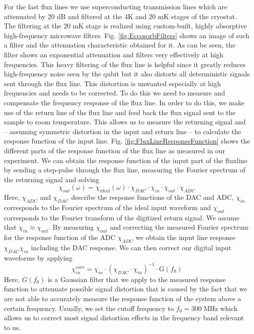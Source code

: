 For the fast flux lines we use superconducting transmission lines which are attenuated by 20 dB and filtered at the 4K and 20 mK stages of the cryostat. The filtering at the 20 mK stage is realized using custom-built, highly absorptive high-frequency microwave filters. Fig. \ref{fig:EccosorbFilters} shows an image of such a filter and the attenuation characteristic obtained for it. As can be seen, the filter shows an exponential attenuation and filters very effectively at high frequencies. This heavy filtering of the flux line is helpful since it greatly reduces high-frequency noise seen by the qubit but it also distorts all deterministic signals sent through the flux line. This distortion is unwanted especially at high frequencies and needs to be corrected. To do this we need to measure and compensate the frequency response of the flux line. In order to do this, we make use of the return line of the flux line and feed back the flux signal sent to the sample to room temperature. This allows us to measure the returning signal and -- assuming symmetric distortion in the input and return line -- to calculate the response function of the input line. Fig. \ref{fig:FluxLineResponseFunction} shows the different parts of the response function of the flux line as measured in our experiment. We can obtain the response function of the input part of the fluxline by sending a step-pulse through the flux line, measuring the Fourier spectrum of the returning  signal and solving
%
\begin{equation}
\chi_{out}(\omega) = \chi_{ideal}(\omega)\cdot \chi_{DAC}\cdot \chi_{in} \cdot \chi_{out}\cdot\chi_{ADC} \label{eq:flux_response}
\end{equation}
%
Here, $\chi_{ADC}$ and $\chi_{DAC}$ describe the response functions of the DAC and ADC, $\chi_{in}$ corresponds to the Fourier spectrum of the ideal input waveform and $\chi_{out}$ corresponds to the Fourier transform of the digitized return signal. We assume that $\chi_{in}\approx\chi_{out}$. By measuring $\chi_{out}$ and correcting the measured Fourier spectrum for the response function of the ADC $\chi_{ADC}$ we obtain the input line response $\chi_{DAC}\chi_{in}$ including the DAC response. We can then correct our digital input waveforms by applying
%
\begin{equation}
\chi_{in}^{corr} = \chi_{in}\cdot (\chi_{DAC}\cdot\chi_{in})^{-1}\cdot \mathrm{G}(f_0)
\end{equation}
%
Here, $G(f_0)$ is a Gaussian filter that we apply to the measured response function to attenuate possible signal distortion that is caused by the fact that we are not able to accurately measure the response function of the system above a certain frequency. Usually, we set the cutoff frequency to $f_0=300\;\mathrm{MHz}$ which allows us to correct most signal distortion effects in the frequency band relevant to us.

